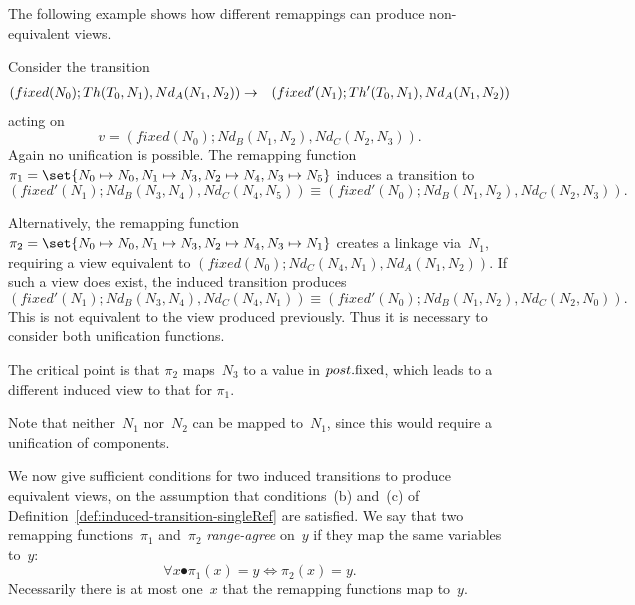 The following example shows how different remappings can produce
non-equivalent views.
% 
\begin{example}\label{example:singleRef-remapping-post-servers}
Consider the transition
% 
\begin{eqnarray*}
(fixed(N_0); Th(T_0,N_1), Nd_A(N_1,N_2)) & \stackrel{}\rightarrow &
  (fixed'(N_1); Th'(T_0,N_1), Nd_A(N_1,N_2))
\end{eqnarray*}
acting on
\[
v = (fixed(N_0); Nd_B(N_1,N_2), Nd_C(N_2,N_3)).
\]
Again no unification is possible.  The remapping function $\pi_1 = \set{N_0
  \mapsto N_0, \linebreak[1] {N_1 \mapsto N_3}, \linebreak[1] {N_2 \mapsto
    N_4}, \linebreak[1] {N_3 \mapsto N_5}}$ induces a transition to
\[
(fixed'(N_1); Nd_B(N_3,N_4), Nd_C(N_4,N_5)) \equiv
(fixed'(N_0); Nd_B(N_1,N_2), Nd_C(N_2,N_3)).
\]

Alternatively, the remapping function $\pi_2 = \set{{N_0 \mapsto N_0}, {N_1
    \mapsto N_3}, \linebreak[1] {N_2 \mapsto N_4}, \linebreak[1] {N_3 \mapsto
    N_1}}$ creates a linkage via~$N_1$, requiring a view equivalent to
$(fixed(N_0); Nd_C(N_4,N_1), Nd_A(N_1,N_2))$.  If such a view does exist, the
induced transition produces
\[
(fixed'(N_1); Nd_B(N_3,N_4), Nd_C(N_4,N_1)) \equiv
(fixed'(N_0); Nd_B(N_1,N_2), Nd_C(N_2,N_0)).
\]
This is not equivalent to the view produced previously.  Thus it is necessary
to consider both unification functions.

The critical point is that $\pi_2$ maps~$N_3$ to a value in $post.\mathrm{fixed}$,
which leads to a different induced view to that for $\pi_1$.

Note that neither~$N_1$ nor~$N_2$ can be mapped to~$N_1$, since this would
require a unification of components. 
\end{example}


We now give sufficient conditions for two induced transitions to produce
equivalent views, on the assumption that conditions~(b) and~(c) of
Definition~\ref{def:induced-transition-singleRef} are satisfied. 
We say that two remapping functions~$\pi_1$ and~$\pi_2$ \emph{range-agree}
on~$y$ if they map the same variables to~$y$:
\[
\forall x \spot \pi_1(x) = y \iff \pi_2(x) = y.
\]
Necessarily there is at most one~$x$ that the remapping functions map
to~$y$.

